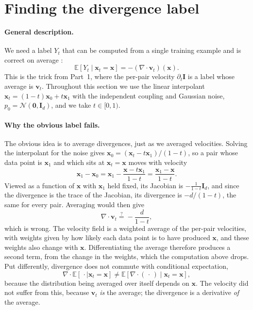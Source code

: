 \documentclass[11pt,a4paper]{article}
\numberwithin{equation}{section}     %
\theoremstyle{plain}        %
\theoremstyle{definition}   %
\theoremstyle{remark}       %
\begin{document}
\newpage

\section{Finding the divergence label}\label{sec:label}

\paragraph{General description.} We need a label $Y_t$ that can be computed from a single training example and is correct on average \citep{ouyang2026}:
\[
\mathbb{E}\left[Y_t\mid\mathbf{x}_t=\mathbf{x}\right]=-\left(\nabla\cdot\mathbf{v}_t\right)(\mathbf{x}).
\]
This is the trick from Part~1, where the per-pair velocity $\partial_t\mathbf{I}$ is a label whose average is $\mathbf{v}_t$. Throughout this section we use the linear interpolant $\mathbf{x}_t=(1-t)\mathbf{x}_0+t\mathbf{x}_1$ with the independent coupling and Gaussian noise, $p_0=\mathcal{N}(\mathbf{0},\mathbf{I}_d)$, and we take $t\in[0,1)$.

\paragraph{Why the obvious label fails.} The obvious idea is to average divergences, just as we averaged velocities. Solving the interpolant for the noise gives $\mathbf{x}_0=(\mathbf{x}_t-t\mathbf{x}_1)/(1-t)$, so a pair whose data point is $\mathbf{x}_1$ and which sits at $\mathbf{x}_t=\mathbf{x}$ moves with velocity
\[
\mathbf{x}_1-\mathbf{x}_0=\mathbf{x}_1-\frac{\mathbf{x}-t\mathbf{x}_1}{1-t}=\frac{\mathbf{x}_1-\mathbf{x}}{1-t}.
\]
Viewed as a function of $\mathbf{x}$ with $\mathbf{x}_1$ held fixed, its Jacobian is $-\frac{1}{1-t}\mathbf{I}_d$, and since the divergence is the trace of the Jacobian, its divergence is $-d/(1-t)$, the same for every pair. Averaging would then give
\[
\nabla\cdot\mathbf{v}_t\overset{?}{=}-\frac{d}{1-t},
\]
which is wrong. The velocity field is a weighted average of the per-pair velocities, with weights given by how likely each data point is to have produced $\mathbf{x}$, and these weights also change with $\mathbf{x}$. Differentiating the average therefore produces a second term, from the change in the weights, which the computation above drops. Put differently, divergence does not commute with conditional expectation,
\[
\nabla\cdot\mathbb{E}\left[\,\cdot\mid\mathbf{x}_t=\mathbf{x}\right]\neq\mathbb{E}\left[\nabla\cdot(\,\cdot\,)\mid\mathbf{x}_t=\mathbf{x}\right],
\]
because the distribution being averaged over itself depends on $\mathbf{x}$. The velocity did not suffer from this, because $\mathbf{v}_t$ \emph{is} the average; the divergence is a derivative \emph{of} the average.
\end{document}
